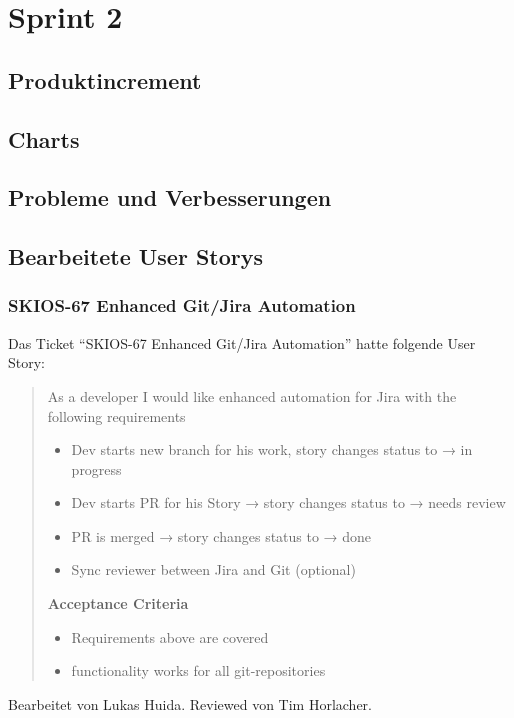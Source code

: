 \section{Sprint 2}
\subsection{Produktincrement}
\subsection{Charts}
\subsection{Probleme und Verbesserungen}

\subsection{Bearbeitete User Storys}

\subsubsection{SKIOS-67 Enhanced Git/Jira Automation}
Das Ticket \enquote{SKIOS-67 Enhanced Git/Jira Automation} hatte folgende User Story:
\begin{quotation}
    As a developer I would like enhanced automation for Jira with the following requirements
    \begin{itemize}
        \item Dev starts new branch for his work, story changes status to → in progress
        \item Dev starts PR for his Story → story changes status to → needs review
        \item PR is merged → story changes status to → done
        \item Sync reviewer between Jira and Git (optional) 
    \end{itemize}

    \textbf{Acceptance Criteria}
    \begin{itemize}
        \item Requirements above are covered
        \item functionality works for all git-repositories
    \end{itemize}
\end{quotation}
Bearbeitet von Lukas Huida.
Reviewed von Tim Horlacher.

